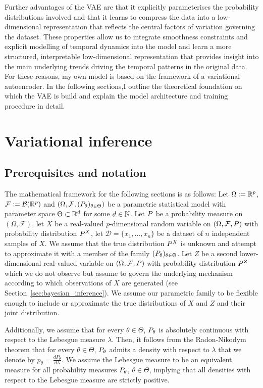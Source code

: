 Further advantages of the VAE are that it explicitly parameterises the probability distributions involved and that it learns to compress the data into a low-dimensional representation that reflects the central factors of variation governing the dataset. These properties allow us to integrate smoothness constraints and explicit modelling of temporal dynamics into the model and learn a more structured, interpretable low-dimensional representation that provides insight into the main underlying trends driving the temporal patterns in the original data. For these reasons, my own model is based on the framework of a variational autoencoder. In the following sections,I outline the theoretical foundation on which the VAE is build and explain the model architecture and training procedure in detail.  

\section{Variational inference}\label{sec:VI}

\subsection{Prerequisites and notation}\label{sec:inference_basics_notation}
The mathematical framework for the following sections is as follows: 
Let $\Omega := \R^p$, $\mathcal{F} := \mathcal{B}(\R^p)$ and $(\Omega, \mathcal{F}, (\P_{\theta})_{\theta\in \Theta})$ be a parametric statistical model with parameter space $\Theta\subset \R^d$ for some $d\in \N$. Let $\P$ be a probability measure on $(\Omega, \mathcal{F})$, let $X$ be a real-valued $p$-dimensional random variable on $(\Omega, \mathcal{F}, \P)$ with probability distribution $\P^X$, let $\mathcal{D} = \lbrace x_1, \dots, x_n \rbrace $ be a dataset of $n$ independent samples of $X$. We assume that the true distribution $\P^X$ is unknown and attempt to approximate it with a member of the family $(\P_{\theta})_{\theta\in\Theta}$.
Let $Z$ be a second lower-dimensional real-valued variable on $(\Omega, \mathcal{F}, \P)$ with probability distribution $\P^Z$ which we do not observe but assume to govern the underlying mechanism according to which observations of $X$ are generated (see Section~\ref{sec:bayesian_inference}). We assume our parametric family to be flexible enough to include or approximate the true distributions of $X$ and $Z$ and their joint distribution.

Additionally, we assume that for every $\theta \in \Theta$, $\P_{\theta}$ is absolutely continuous with respect to the Lebesgue measure $\lambda$. Then, it follows from the Radon-Nikodym theorem that for every $\theta \in \Theta$, $\P_{\theta}$ admits a density with respect to $\lambda$ that we denote by $p_{\theta} = \frac{dP_{\theta}}{d\lambda}$. We assume the Lebesgue measure to be an equivalent measure for all probability measures $\P_{\theta}$, $\theta\in \Theta$, implying that all densities with respect to the Lebesgue measure are strictly positive. 

